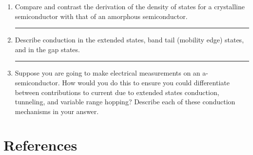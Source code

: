 \documentclass[12pt]{elsarticle}
\newcommand{\fullline}{\noindent\rule{14cm}{0.4pt} \vspace{4mm}}
\begin{document}
\begin{enumerate}
\fullline

\item Compare and contrast the derivation of the density of states for a crystalline
semiconductor with that of an amorphous semiconductor.
\par 
\fullline

\item Describe conduction in the extended states, band tail (mobility edge) states, and in the
gap states. 
\par 
\fullline

\item Suppose you are going to make electrical measurements on an a-semiconductor. How
would you do this to ensure you could differentiate between contributions to current due
to extended states conduction, tunneling, and variable range hopping? Describe each of
these conduction mechanisms in your answer.




\end{enumerate}


\section*{References}


\end{document}
